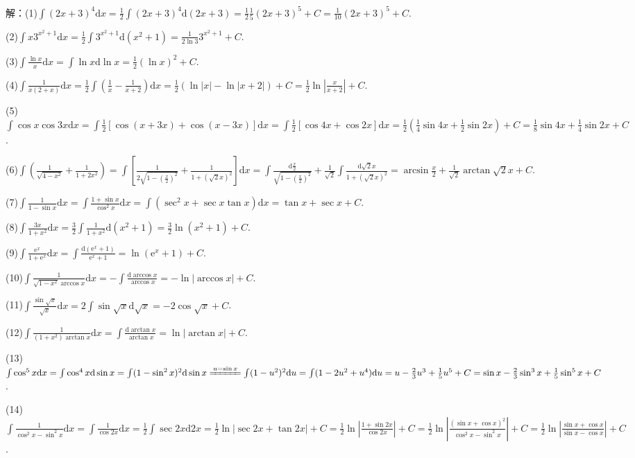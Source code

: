 \documentclass[12pt,UTF8]{ctexart}
\begin{document}
\begin{enumerate}
解：(1)$\int(2x+3)^4\mathrm dx=\frac12\int(2x+3)^4\mathrm d(2x+3)=\frac12\frac15(2x+3)^5+C=\frac1{10}(2x+3)^5+C$.

(2)$\int x3^{x^2+1}\mathrm dx=\frac12\int3^{x^2+1}\mathrm d(x^2+1)=\frac1{2\ln3}3^{x^2+1}+C$.

(3)$\int\frac{\ln x}x\mathrm dx=\int\ln x\mathrm d\ln x=\frac12(\ln x)^2+C$.

(4)$\int\frac1{x(2+x)}\mathrm dx=\frac12\int(\frac1x-\frac1{x+2})\mathrm dx=\frac12(\ln|x|-\ln|x+2|)+C=\frac12\ln|\frac x{x+2}|+C$.

(5)$\int\cos x\cos3x\mathrm dx=\int\frac12[\cos(x+3x)+\cos(x-3x)]\mathrm dx=\int\frac12[\cos4x+\cos2x]\mathrm dx=\frac12(\frac14\sin4x+\frac12\sin2x)+C=\frac18\sin4x+\frac14\sin2x+C$.

(6)$\int(\frac1{\sqrt{4-x^2}}+\frac1{1+2x^2})=\int[\frac1{2\sqrt{1-(\frac x2)^2}}+\frac1{1+(\sqrt2x)^2}]\mathrm dx=\int\frac{\mathrm d\frac x2}{\sqrt{1-(\frac x2)^2}}+\frac1{\sqrt2}\int\frac{\mathrm d\sqrt2x}{1+(\sqrt2x)^2}=\arcsin\frac x2+\frac1{\sqrt2}\arctan\sqrt2x+C$.

(7)$\int\frac1{1-\sin x}\mathrm dx=\int\frac{1+\sin x}{\cos^2x}\mathrm dx=\int(\sec^2x+\sec x\tan x)\mathrm dx=\tan x+\sec x+C$.

(8)$\int\frac{3x}{1+x^2}\mathrm dx=\frac32\int\frac1{1+x^2}\mathrm d(x^2+1)=\frac32\ln(x^2+1)+C$.

(9)$\int\frac{\mathrm e^x}{1+\mathrm e^x}\mathrm dx=\int\frac{\mathrm d(\mathrm e^x+1)}{\mathrm e^x+1}=\ln(\mathrm e^x+1)+C$.

(10)$\int\frac1{\sqrt{1-x^2}\arccos x}\mathrm dx=-\int\frac{\mathrm d\arccos x}{\arccos x}=-\ln|\arccos x|+C$.

(11)$\int\frac{\sin\sqrt x}{\sqrt x}\mathrm dx=2\int\sin\sqrt x\mathrm d\sqrt x=-2\cos\sqrt x+C$.

(12)$\int\frac1{(1+x^2)\arctan x}\mathrm dx=\int\frac{\mathrm d\arctan x}{\arctan x}=\ln|\arctan x|+C$.

(13)$\int\cos^5x\mathrm dx=\int\cos^4x\mathrm d\sin x=\int(1-\sin^2x)^2\mathrm d\sin x\xlongequal{u=\sin x}\int(1-u^2)^2\mathrm du=\int(1-2u^2+u^4)\mathrm du=u-\frac23u^3+\frac15u^5+C=\sin x-\frac23\sin^3x+\frac15\sin^5x+C$.

(14)$\int\frac1{\cos^2x-\sin^2x}\mathrm dx=\int\frac1{\cos2x}\mathrm dx=\frac12\int\sec2x\mathrm d2x=\frac12\ln|\sec2x+\tan2x|+C=\frac12\ln|\frac{1+\sin2x}{\cos2x}|+C=\frac12\ln|\frac{(\sin x+\cos x)^2}{\cos^2x-\sin^2x}|+C=\frac12\ln|\frac{\sin x+\cos x}{\sin x-\cos x}|+C$.


\end{enumerate}
\end{document}
